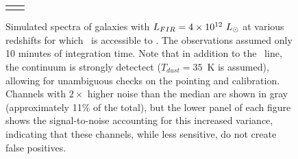 \begin{figure}[h]
\begin{tabular}{ll}
\begin{minipage}{3.25in}
\begin{center}
      \end{center}
    \end{minipage} &
    \begin{minipage}{3.25in}
      \begin{center}
	\caption {\small Simulated spectra of galaxies with $L_{FIR}=4\times10^{12}~L_{\odot}$ at various redshifts for which \cii\ is accessible to \name.  The observations assumed only 10 minutes of integration time.  Note that in addition to the \cii\ line, the continuum is strongly detectect ($T_{dust}=35$~K is assumed), allowing for unambiguous checks on the pointing and calibration.  Channels with $2\times$ higher noise than the median are shown in gray (approximately 11\% of the total), but the lower panel of each figure shows the signal-to-noise accounting for this increased variance, indicating that these channels, while less sensitive, do not create false positives.}
	\label{fig:SimGalaxies}
	\end{center}
    \end{minipage}
  \end{tabular}
    
\label{fig:IMapping}
\end{figure}


